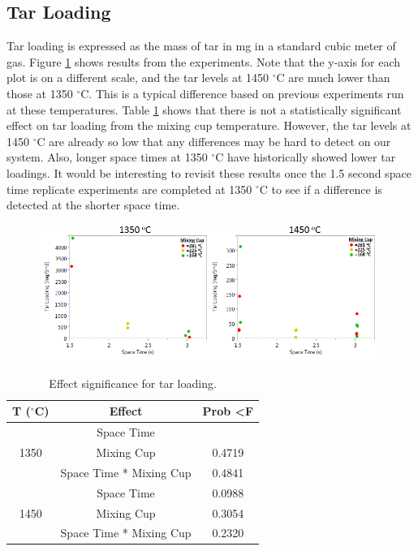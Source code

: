\documentclass[11pt,twocolumn]{article}
\begin{document}
\subsection*{Tar Loading}

Tar loading is expressed as the mass of tar in mg
in a standard cubic meter of gas. Figure \ref{plot_tar} shows
results from the experiments. Note that the y-axis for each plot is on a different scale, and the
tar levels at 1450 $^\circ$C are much lower than those
at 1350 $^\circ$C. This is a typical difference based on
previous experiments run at these temperatures.
Table \ref{tbl_tar} shows that there is not a statistically
significant effect on tar loading from the mixing
cup temperature. However, the tar levels at 1450
$^\circ$C are already so low that any differences may
be hard to detect on our system. Also, longer
space times at 1350 $^\circ$C have historically showed
lower tar loadings. It would be interesting to revisit these results once the 1.5 second space time
replicate experiments are completed at 1350 $^\circ$C to
see if a difference is detected at the shorter space
time.

\begin{figure}
\centering
\includegraphics[width = \textwidth]{tar_loading.png}
\caption{}
\label{plot_tar}
\end{figure}

\begin{table}
	\centering
	\caption{Effect significance for tar loading.}
	\label{tbl_tar}
	\begin{tabular}{|c|c|c|}
	\hline
	T ($^\circ$C)			&	Effect				&	Prob \textless F	\\
	\hline
	\multirow{3}{*}{1350}	&	Space Time			&	\color{red}{0.0114} \\
	{}					&	Mixing Cup			&	0.4719 \\
	{}					&	Space Time * Mixing Cup	&	0.4841 \\
	\hline
	\multirow{3}{*}{1450}	&	Space Time			&	0.0988 \\
	{}					&	Mixing Cup			&	0.3054 \\
	{}					&	Space Time * Mixing Cup	&	0.2320 \\	
	\hline
	\end{tabular}
\end{table}
\end{document}
